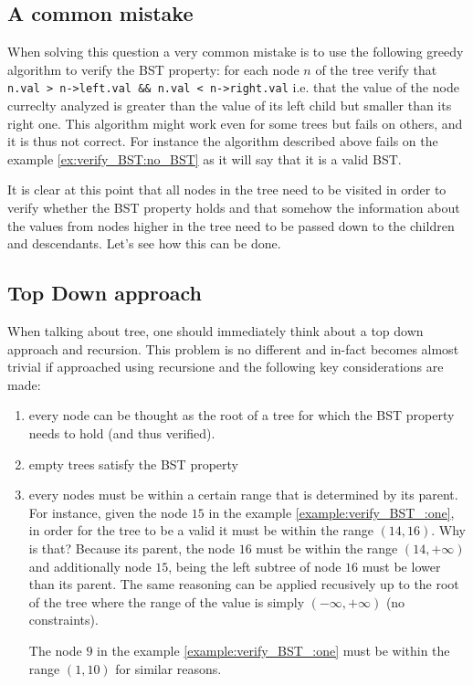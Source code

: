 \subsection{A common mistake}
When solving this question a very common mistake is to use the following greedy algorithm to verify the BST property: for each node $n$ of the tree verify that \lstinline[columns=fixed]{n.val > n->left.val && n.val < n->right.val} i.e. that the value of the node curreclty analyzed is greater than the value of its left child but smaller than its right one. This algorithm might work even for some trees but fails on others, and it is thus not correct. For instance the algorithm described above fails on the example \ref{ex:verify_BST:no_BST} as it will say that it is a valid BST.

It is clear at this point that all nodes in the tree need to be visited in order to verify whether the BST property holds and that somehow the information about the values from nodes higher in the tree need to be passed down to the children and descendants. Let's see how this can be done.

\subsection{Top Down approach}
\label{verify_BST:sec:topdown}
When talking about tree, one should immediately think about a top down approach and recursion. This problem is no different and in-fact  becomes almost trivial if approached using recursione and the following key considerations are made:
\begin{enumerate}
	\item every node can be thought as the root of a tree for which the BST property needs to hold (and thus verified). 
	\item empty trees satisfy the BST property
	\item every nodes must be within a certain range that is determined by its parent. For instance, given the node $15$ in the example \ref{example:verify_BST_:one}, in order for the tree to be a valid it must be within the range $(14,16)$. Why is that? Because its parent, the node $16$ must be within the range $(14,+\infty)$ and additionally node $15$, being the left subtree of node $16$ must be lower than its parent. The same reasoning can be applied recusively up to the root of the tree where the range of the value is simply $(-\infty, +\infty)$ (no constraints). 

	The node $9$ in the example \ref{example:verify_BST_:one} must be within the range $(1,10)$ for similar reasons.
\end{enumerate}


